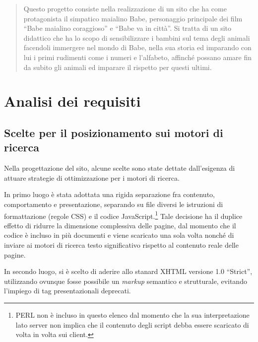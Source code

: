 \documentclass[10pt,a4paper,onecolumn]{article}
\newcommand{\inglese}[1]{\foreignlanguage{english}{\itshape{}#1}}
\begin{document}
\clearpage

\tableofcontents

\clearpage 

\begin{abstract}
Questo progetto consiste nella realizzazione di un sito che ha come protagonista il simpatico maialino Babe, personaggio principale dei film ``Babe maialino coraggioso'' e ``Babe va in città''.
Si tratta di un sito didattico che ha lo scopo di sensibilizzare i bambini sul tema degli animali facendoli immergere nel mondo di Babe, nella sua storia ed imparando con lui i primi rudimenti come i numeri e l'alfabeto, affinché possano amare fin da subito gli animali ed imparare il rispetto per questi ultimi.
\end{abstract}

\clearpage

\section{Analisi dei requisiti}

\subsection{Scelte per il posizionamento sui motori di ricerca}
Nella progettazione del sito, alcune scelte sono state dettate dall'esigenza di attuare strategie di ottimizzazione per i motori di ricerca.

In primo luogo è stata adottata una rigida separazione fra contenuto, comportamento e presentazione, separando su file diversi le istruzioni di formattazione (regole CSS) e il codice JavaScript.\footnote{%
  PERL non è incluso in questo elenco dal momento che la sua interpretazione lato server non implica che il contenuto degli script debba essere scaricato di volta in volta sui client.
} Tale decisione ha il duplice effetto di ridurre la dimensione complessiva delle pagine, dal momento che il codice è incluso in più documenti e viene scaricato una sola volta nonché di inviare ai motori di ricerca testo significativo rispetto al contenuto reale delle pagine.

In secondo luogo, si è scelto di aderire allo stanard XHTML versione 1.0 ``Strict'', utilizzando ovunque fosse possibile un \inglese{markup} semantico e strutturale, evitando l'impiego di tag presentazionali deprecati.
\end{document}
